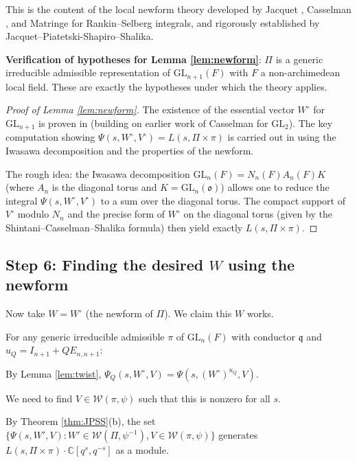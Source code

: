 \documentclass[12pt]{article}
\begin{document}
This is the content of the local newform theory developed by Jacquet \cite{Jacquet1967}, Casselman \cite{Casselman1973}, and Matringe \cite{Matringe2013} for Rankin--Selberg integrals, and rigorously established by Jacquet--Piatetski-Shapiro--Shalika.

\textbf{Verification of hypotheses for Lemma \ref{lem:newform}}: $\Pi$ is a generic irreducible admissible representation of $\mathrm{GL}_{n+1}(F)$ with $F$ a non-archimedean local field. These are exactly the hypotheses under which the theory applies.

\begin{proof}[Proof of Lemma \ref{lem:newform}]
The existence of the essential vector $W^\circ$ for $\mathrm{GL}_{n+1}$ is proven in \cite[Theorem 2.2]{Jacquet2012} (building on earlier work of Casselman for $\mathrm{GL}_2$). The key computation showing $\Psi(s, W^\circ, V^\circ) = L(s, \Pi \times \pi)$ is carried out in \cite[Theorem 1]{JPSS1983} using the Iwasawa decomposition and the properties of the newform.

The rough idea: the Iwasawa decomposition $\mathrm{GL}_n(F) = N_n(F) A_n(F) K$ (where $A_n$ is the diagonal torus and $K = \mathrm{GL}_n(\mathfrak{o})$) allows one to reduce the integral $\Psi(s, W^\circ, V^\circ)$ to a sum over the diagonal torus. The compact support of $V^\circ$ modulo $N_n$ and the precise form of $W^\circ$ on the diagonal torus (given by the Shintani--Casselman--Shalika formula) then yield exactly $L(s, \Pi \times \pi)$.
\end{proof}

\subsection{Step 6: Finding the desired $W$ using the newform}

Now take $W = W^\circ$ (the newform of $\Pi$). We claim this $W$ works.

For any generic irreducible admissible $\pi$ of $\mathrm{GL}_n(F)$ with conductor $\mathfrak{q}$ and $u_Q = I_{n+1} + QE_{n,n+1}$:

By Lemma \ref{lem:twist}, $\Psi_Q(s, W^\circ, V) = \Psi(s, (W^\circ)^{u_Q}, V)$.

We need to find $V \in \mathcal{W}(\pi, \psi)$ such that this is nonzero for all $s$.

By Theorem \ref{thm:JPSS}(b), the set $\{\Psi(s, W', V) : W' \in \mathcal{W}(\Pi, \psi^{-1}), V \in \mathcal{W}(\pi, \psi)\}$ generates $L(s, \Pi \times \pi) \cdot \mathbb{C}[q^s, q^{-s}]$ as a module.
\end{document}
